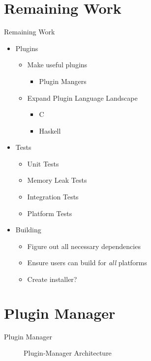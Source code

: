 \documentclass[UKenglish]{beamer}
\begin{document}
\section{Remaining Work}
\begin{frame}{Remaining Work}
\begin{itemize}
  \item Plugins
  \begin{itemize}
    \item Make useful plugins
      \begin{itemize}
        \item Plugin Mangers
      \end{itemize}
    \item Expand Plugin Language Landscape
      \begin{itemize}
        \item C
        \item Haskell
      \end{itemize}
  \end{itemize}

  \item Tests
  \begin{itemize}
    \item Unit Tests
    \item Memory Leak Tests
    \item Integration Tests
    \item Platform Tests
  \end{itemize}
  \item Building
  \begin{itemize}
    \item Figure out all necessary dependencies
    \item Ensure users can build for \textit{all} platforms
    \item Create installer?
  \end{itemize}
\end{itemize}
\end{frame}

\section{Plugin Manager}
\begin{frame}{Plugin Manager}
    \begin{figure}
        \centering
        
        \caption{Plugin-Manager Architecture}
    \end{figure}
\end{frame}
\end{document}
